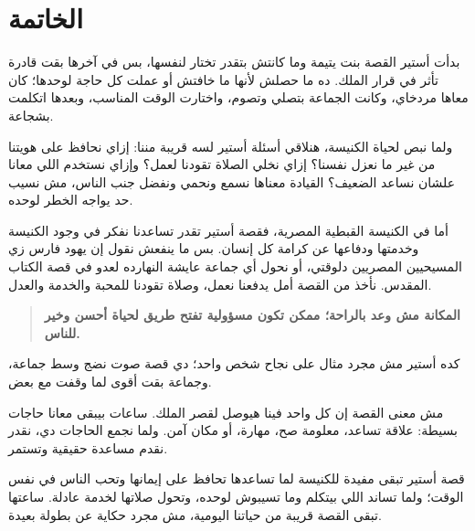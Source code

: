 \documentclass[12pt,a4paper]{article}
\begin{document}
\section*{الخاتمة}
بدأت أستير القصة بنت يتيمة وما كانتش بتقدر تختار لنفسها، بس في آخرها بقت قادرة تأثر في قرار الملك. ده ما حصلش لأنها ما خافتش أو عملت كل حاجة لوحدها؛ كان معاها مردخاي، وكانت الجماعة بتصلي وتصوم، واختارت الوقت المناسب، وبعدها اتكلمت بشجاعة.\par\medskip
ولما نبص لحياة الكنيسة، هنلاقي أسئلة أستير لسه قريبة مننا: إزاي نحافظ على هويتنا من غير ما نعزل نفسنا؟ إزاي نخلي الصلاة تقودنا لعمل؟ وإزاي نستخدم اللي معانا علشان نساعد الضعيف؟ القيادة معناها نسمع ونحمي ونفضل جنب الناس، مش نسيب حد يواجه الخطر لوحده.\par\medskip
أما في الكنيسة القبطية المصرية، فقصة أستير تقدر تساعدنا نفكر في وجود الكنيسة وخدمتها ودفاعها عن كرامة كل إنسان. بس ما ينفعش نقول إن يهود فارس زي المسيحيين المصريين دلوقتي، أو نحول أي جماعة عايشة النهارده لعدو في قصة الكتاب المقدس. نأخذ من القصة أمل يدفعنا نعمل، وصلاة تقودنا للمحبة والخدمة والعدل.\par\medskip
\begin{quote}\colorbox{soft}{\parbox{0.94\linewidth}{\textbf{المكانة مش وعد بالراحة؛ ممكن تكون مسؤولية تفتح طريق لحياة أحسن وخير للناس.}}}\end{quote}
كده أستير مش مجرد مثال على نجاح شخص واحد؛ دي قصة صوت نضج وسط جماعة، وجماعة بقت أقوى لما وقفت مع بعض.\par\medskip
مش معنى القصة إن كل واحد فينا هيوصل لقصر الملك. ساعات بيبقى معانا حاجات بسيطة: علاقة تساعد، معلومة صح، مهارة، أو مكان آمن. ولما نجمع الحاجات دي، نقدر نقدم مساعدة حقيقية وتستمر.\par\medskip
قصة أستير تبقى مفيدة للكنيسة لما تساعدها تحافظ على إيمانها وتحب الناس في نفس الوقت؛ ولما تساند اللي بيتكلم وما تسيبوش لوحده، وتحول صلاتها لخدمة عادلة. ساعتها تبقى القصة قريبة من حياتنا اليومية، مش مجرد حكاية عن بطولة بعيدة.\par\medskip
\clearpage
\clearpage
\end{document}
